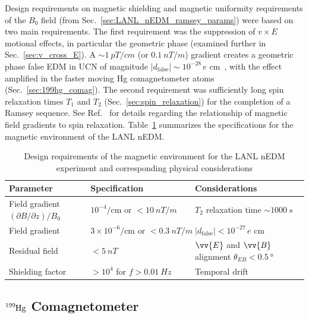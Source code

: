 Design requirements on magnetic shielding and magnetic uniformity requirements of the $B_0$ field (from Sec.~\ref{sec:LANL_nEDM_ramsey_params}) were based on two main requirements. The first requirement was the suppression of $v\times E$ motional effects, in particular the geometric phase (examined further in Sec.~\ref{sec:v_cross_E}). A $\sim\qty{1}{pT\per cm}$ (or $\qty{0.1}{nT\per m}$) gradient creates a geometric phase false EDM in UCN of magnitude $|d_\text{false}|\sim 10^{-28}\,e\text{ cm}$~\cite{lamoreaux_geometric_phase_2005}, with the effect amplified in the faster moving Hg comagnetometer atoms (Sec.~\ref{sec:199hg_comag}). The second requirement was sufficiently long spin relaxation times $T_1$ and $T_2$ (Sec.~\ref{sec:spin_relaxation}) for the completion of a Ramsey sequence. See Ref.~\cite{mcgregor_transverse_1990} for details regarding the relationship of magnetic field gradients to spin relaxation. Table~\ref{tb:lanl_magnetic_design} summarizes the specifications for the magnetic environment of the LANL nEDM.

\begin{table}
\centering
\caption{Design requirements of the magnetic environment for the LANL nEDM experiment and corresponding physical considerations}\label{tb:lanl_magnetic_design}
\begin{tabular}{
    lll
}
\toprule
Parameter		& Specification				& Considerations	\\
\midrule
Field gradient $(\partial B/\partial z)/B_0$	& $10^{-4}/\text{cm or } <\qty{10}{nT\per m}$ & $T_2$ relaxation time $\sim\qty{1000}{s}$\\
Field gradient  & $3\times 10^{-6}/\text{cm or }<\qty{0.3}{nT\per m}$ & $|d_\text{false}|<10^{-27}\,e\text{ cm}$ \\
Residual field & $<\qty{5}{nT}$ & $\vv{E}$ and $\vv{B}$ alignment $\theta_{EB}<\qty{0.5}{\degree}$ \\
Shielding factor & $>10^4$ for $f>\qty{0.01}{Hz}$ & Temporal drift \\
\bottomrule
\end{tabular}
\end{table}


\subsection
{
    \texorpdfstring{$\ce{^{199}Hg}$ Comagnetometer}
                    {199Hg Comagnetometer}\label{sec:199hg_comag}
}

